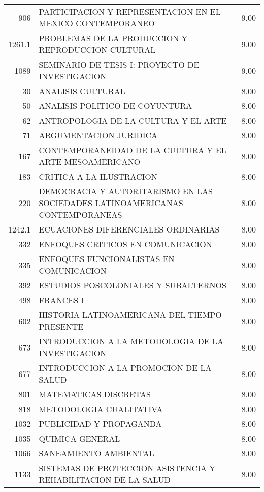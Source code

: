 \documentclass[12pt]{article}
\begin{document}
\begin{table}[ht]
{\begin{tabular}{rlr}
  906 & PARTICIPACION Y REPRESENTACION EN EL MEXICO CONTEMPORANEO & 9.00 \\ 
  1261.1 & PROBLEMAS DE LA PRODUCCION Y REPRODUCCION CULTURAL & 9.00 \\ 
  1089 & SEMINARIO DE TESIS I: PROYECTO DE INVESTIGACION & 9.00 \\ 
  30 & ANALISIS CULTURAL & 8.00 \\ 
  50 & ANALISIS POLITICO DE COYUNTURA & 8.00 \\ 
  62 & ANTROPOLOGIA DE LA CULTURA Y EL ARTE & 8.00 \\ 
  71 & ARGUMENTACION JURIDICA & 8.00 \\ 
  167 & CONTEMPORANEIDAD DE LA CULTURA Y EL ARTE MESOAMERICANO & 8.00 \\ 
  183 & CRITICA A LA ILUSTRACION & 8.00 \\ 
  220 & DEMOCRACIA Y AUTORITARISMO EN LAS SOCIEDADES LATINOAMERICANAS CONTEMPORANEAS & 8.00 \\ 
  1242.1 & ECUACIONES DIFERENCIALES ORDINARIAS & 8.00 \\ 
  332 & ENFOQUES CRITICOS EN COMUNICACION & 8.00 \\ 
  335 & ENFOQUES FUNCIONALISTAS EN COMUNICACION & 8.00 \\ 
  392 & ESTUDIOS POSCOLONIALES Y SUBALTERNOS & 8.00 \\ 
  498 & FRANCES I & 8.00 \\ 
  602 & HISTORIA LATINOAMERICANA DEL TIEMPO PRESENTE & 8.00 \\ 
  673 & INTRODUCCION A LA METODOLOGIA DE LA INVESTIGACION & 8.00 \\ 
  677 & INTRODUCCION A LA PROMOCION DE LA SALUD & 8.00 \\ 
  801 & MATEMATICAS DISCRETAS & 8.00 \\ 
  818 & METODOLOGIA CUALITATIVA & 8.00 \\ 
  1032 & PUBLICIDAD Y PROPAGANDA & 8.00 \\ 
  1035 & QUIMICA GENERAL & 8.00 \\ 
  1066 & SANEAMIENTO AMBIENTAL & 8.00 \\ 
  1133 & SISTEMAS DE PROTECCION ASISTENCIA Y REHABILITACION DE LA SALUD & 8.00 \\ 
   \hline
\end{tabular}}
\end{table}
\end{document}

